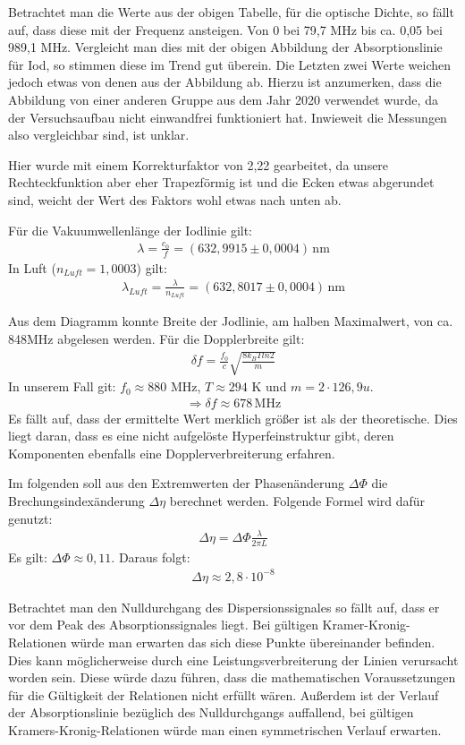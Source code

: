 Betrachtet man die Werte aus der obigen Tabelle, für die optische Dichte, so fällt auf, dass diese mit der Frequenz ansteigen. Von 0 bei 79,7 MHz bis ca. 0,05 bei 989,1 MHz. Vergleicht man dies mit der obigen Abbildung der Absorptionslinie für Iod, so stimmen diese im Trend gut überein. Die Letzten zwei Werte weichen jedoch etwas von denen aus der Abbildung ab. Hierzu ist anzumerken, dass die Abbildung von einer anderen Gruppe aus dem Jahr 2020 verwendet wurde, da der Versuchsaufbau nicht einwandfrei funktioniert hat. Inwieweit die Messungen also vergleichbar sind, ist unklar.

Hier wurde mit einem Korrekturfaktor von 2,22 gearbeitet, da unsere Rechteckfunktion aber eher Trapezförmig ist und die Ecken etwas abgerundet sind, weicht der Wert des Faktors wohl etwas nach unten ab.

Für die Vakuumwellenlänge der Iodlinie gilt:
\begin{gather}
    \lambda = \frac{c_0}{f} = (632,9915 \pm 0,0004) \, \text{nm}
\end{gather}
In Luft ($n_{Luft} = 1,0003$) gilt:
\begin{gather}
    \lambda_{Luft} = \frac{\lambda}{n_{Luft}} = (632,8017 \pm 0,0004)\, \text{nm}
\end{gather}

Aus dem Diagramm konnte Breite der Jodlinie, am halben Maximalwert, von ca. 848MHz abgelesen werden.
Für die Dopplerbreite gilt:
\begin{gather}
    \delta f = \frac{f_0}{c} \sqrt{\frac{8 k_B T ln2}{m}}
\end{gather}
In unserem Fall git: $f_0 \approx 880$ MHz,  $T \approx 294$ K und $m = 2 \cdot 126,9 u$.
\begin{gather}
    \Rightarrow \delta f \approx 678 \, \text{MHz}
\end{gather}
Es fällt auf, dass der ermittelte Wert merklich größer ist als der theoretische. Dies liegt daran, dass es eine nicht aufgelöste Hyperfeinstruktur gibt, deren Komponenten ebenfalls eine Dopplerverbreiterung erfahren.


Im folgenden soll aus den Extremwerten der Phasenänderung $\Delta \Phi$ die Brechungsindexänderung $\Delta \eta$ berechnet werden. Folgende Formel wird dafür genutzt:
\begin{gather}
    \Delta \eta = \Delta \Phi \frac{\lambda}{2 \pi L}
\end{gather}
Es gilt: $\Delta \Phi \approx 0,11$. Daraus folgt:
\begin{gather}
    \Delta \eta \approx 2,8 \cdot 10^{-8}
\end{gather}

Betrachtet man den Nulldurchgang des Dispersionssignales so fällt auf, dass er vor dem Peak des Absorptionssignales liegt. Bei gültigen Kramer-Kronig-Relationen würde man erwarten das sich diese Punkte übereinander befinden. Dies kann möglicherweise durch eine Leistungsverbreiterung der Linien verursacht worden sein. Diese würde dazu führen, dass die mathematischen Voraussetzungen für die Gültigkeit der Relationen nicht erfüllt wären.
Außerdem ist der Verlauf der Absorptionslinie bezüglich des Nulldurchgangs auffallend, bei gültigen Kramers-Kronig-Relationen würde man einen symmetrischen Verlauf erwarten.
